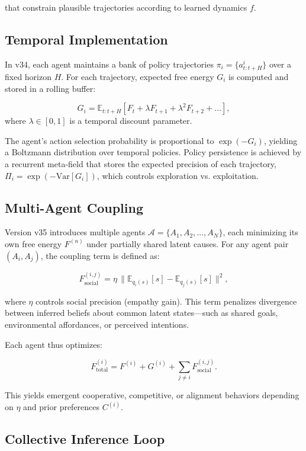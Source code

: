 \documentclass[9pt]{elife}
\begin{document}
that constrain plausible trajectories according to learned dynamics $f$.

\subsection{Temporal Implementation}

In v34, each agent maintains a bank of policy trajectories
$\pi_i = \{a_{t:t+H}^i\}$ over a fixed horizon $H$.
For each trajectory, expected free energy $G_i$ is computed and stored
in a rolling buffer:

\[
G_i = \mathbb{E}_{t:t+H} [ F_t + \lambda F_{t+1} + \lambda^2 F_{t+2} + \dots ],
\]
where $\lambda \in [0,1]$ is a temporal discount parameter.

The agent’s action selection probability is proportional to $\exp(-G_i)$,
yielding a Boltzmann distribution over temporal policies.
Policy persistence is achieved by a recurrent meta-field that
stores the expected precision of each trajectory, 
$\Pi_i = \exp(-\mathrm{Var}[G_i])$,
which controls exploration vs. exploitation.

\subsection{Multi-Agent Coupling}

Version v35 introduces multiple agents $\mathcal{A} = \{A_1, A_2, \dots, A_N\}$,
each minimizing its own free energy $F^{(n)}$ under partially shared latent causes.
For any agent pair $(A_i, A_j)$, the coupling term is defined as:

\begin{equation}
F_{\text{social}}^{(i,j)} 
= \eta \, \big\| \mathbb{E}_{q_i(s)}[s] - \mathbb{E}_{q_j(s)}[s] \big\|^2 ,
\end{equation}

where $\eta$ controls social precision (empathy gain).
This term penalizes divergence between inferred beliefs about
common latent states—such as shared goals, environmental affordances,
or perceived intentions.

Each agent thus optimizes:

\[
F_{\text{total}}^{(i)} = F^{(i)} + G^{(i)} + \sum_{j\neq i} F_{\text{social}}^{(i,j)} .
\]

This yields emergent cooperative, competitive, or alignment behaviors
depending on $\eta$ and prior preferences $C^{(i)}$.

\subsection{Collective Inference Loop}
\end{document}
